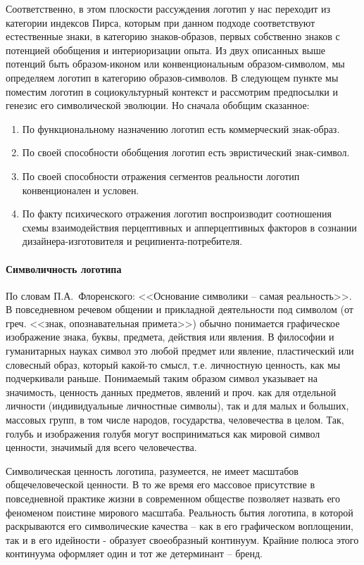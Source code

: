 Соответственно, в этом плоскости рассуждения логотип у нас переходит из категории
индексов Пирса, которым при данном подходе соответствуют естественные знаки,
в категорию знаков-образов, первых собственно знаков с потенцией обобщения и
интериоризации опыта. Из двух описанных выше потенций быть  образом-иконом
или конвенциональным образом-символом, мы определяем логотип в категорию
образов-символов. В следующем пункте мы поместим логотип в социокультурный
контекст и рассмотрим предпосылки и генезис его символической эволюции.
Но сначала обобщим сказанное:
\begin{enumerate}
\item По функциональному назначению логотип есть коммерческий знак-образ.
\item По своей способности обобщения логотип есть эвристический знак-символ.
\item По своей способности отражения сегментов реальности логотип конвенционален и условен.
\item По факту психического отражения логотип воспроизводит соотношения схемы
  взаимодействия перцептивных и апперцептивных факторов в сознании дизайнера-изготовителя
  и реципиента-потребителя.
\end{enumerate}

\paragraph{Символичность логотипа}
По словам П.А.~Флоренского: <<Основание символики -- самая
реальность>>\autocite[425]{book:florensky1}. В повседневном речевом общении и прикладной
деятельности под символом (от греч. <<знак, опознавательная примета>>) обычно
понимается графическое изображение знака, буквы, предмета, действия или явления.
В философии и гуманитарных науках символ это любой предмет или явление,
пластический или словесный образ, который какой-то смысл, т.е. личностную ценность,
как мы подчеркивали раньше. Понимаемый таким образом символ указывает на значимость,
ценность данных предметов, явлений и проч. как для отдельной личности
(индивидуальные личностные символы), так и для малых и больших, массовых групп,
в том числе народов, государства, человечества в целом. Так, голубь и изображения
голубя могут восприниматься как мировой символ ценности, значимый для всего
человечества.

Символическая ценность логотипа, разумеется, не имеет масштабов общечеловеческой ценности.
В то же время его массовое присутствие в повседневной практике жизни в современном
обществе позволяет назвать его феноменом поистине мирового масштаба. Реальность
бытия логотипа, в которой раскрываются его символические качества -- как в его графическом
воплощении, так и в его идейности - образует своеобразный континуум.
Крайние полюса этого континуума оформляет один и тот же детерминант -- бренд.


